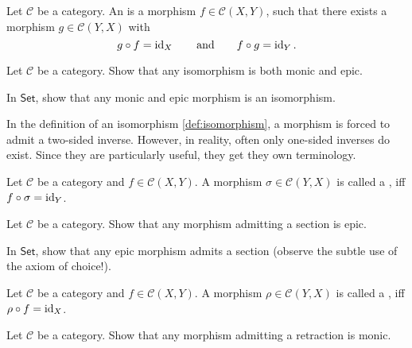 \begin{definition}[Isomorphism]
	\label{def:isomorphism}
	Let $\mathcal{C}$ be a category. An  is a morphism $f \in \mathcal{C}(X,Y)$, such that there exists a morphism $g \in \mathcal{C}(Y,X)$ with 
	\begin{equation*}
		g \circ f = \operatorname{id}_X \qquad \text{and} \qquad f \circ g = \operatorname{id}_Y.
	\end{equation*}
\end{definition}

\begin{exercise}
	Let $\mathcal{C}$ be a category. Show that any isomorphism is both monic and epic.
\end{exercise}

\begin{exercise}
	In $\mathsf{Set}$, show that any monic and epic morphism is an isomorphism.
\end{exercise}

In the definition of an isomorphism \ref{def:isomorphism}, a morphism is forced to admit a two-sided inverse. However, in reality, often only one-sided inverses do exist. Since they are particularly useful, they get they own terminology.

\begin{definition}[Section]
	Let $\mathcal{C}$ be a category and $f \in \mathcal{C}(X,Y)$. A morphism $\sigma \in \mathcal{C}(Y,X)$ is called a , iff $f \circ \sigma = \operatorname{id}_Y$.
\end{definition}

\begin{exercise}
	Let $\mathcal{C}$ be a category. Show that any morphism admitting a section is epic.
\end{exercise}

\begin{exercise}
	In $\mathsf{Set}$, show that any epic morphism admits a section (observe the subtle use of the axiom of choice!).
\end{exercise}

\begin{definition}[Retraction]
	Let $\mathcal{C}$ be a category and $f \in \mathcal{C}(X,Y)$. A morphism $\rho \in \mathcal{C}(Y,X)$ is called a , iff $\rho \circ f = \operatorname{id}_X$.
\end{definition}

\begin{exercise}
	Let $\mathcal{C}$ be a category. Show that any morphism admitting a retraction is monic.
\end{exercise}


